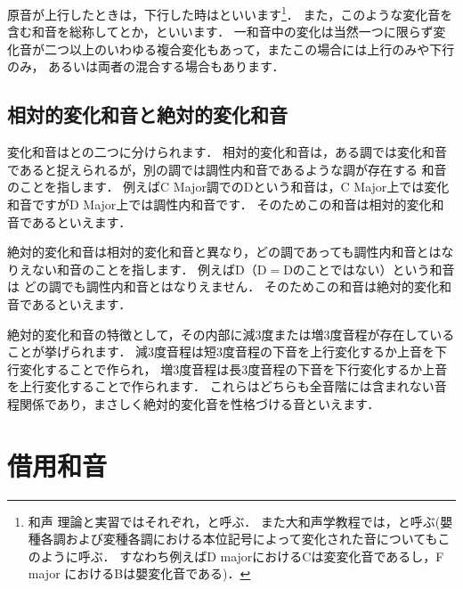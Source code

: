 \documentclass[dvipdfmx,uplatex,b5paper,openany,jbase=12Q,nomag*,textwidth-limit=44%
               ]{gachimuchi}[2020/05/05]
\begin{document}
原音が上行したときは，下行した時はといいます\footnote{%
和声 理論と実習ではそれぞれ，と呼ぶ．
また大和声学教程では，と呼ぶ(嬰種各調および変種各調における本位記号によって変化された音についてもこのように呼ぶ．
すなわち例えばD majorにおけるC\aNatural は変変化音であるし，F major におけるB\aNatural は嬰変化音である)．
}．
また，このような変化音を含む和音を総称してとか，といいます．
一和音中の変化は当然一つに限らず変化音が二つ以上のいわゆる複合変化もあって，またこの場合には上行のみや下行のみ，
あるいは両者の混合する場合もあります．

\subsection{相対的変化和音と絶対的変化和音}
変化和音はとの二つに分けられます．
相対的変化和音は，ある調では変化和音であると捉えられるが，別の調では調性内和音であるような調が存在する
和音のことを指します．
例えばC Major調でのDという和音は，C Major上では変化和音ですがD Major上では調性内和音です．
そのためこの和音は相対的変化和音であるといえます．

絶対的変化和音は相対的変化和音と異なり，どの調であっても調性内和音とはなりえない和音のことを指します．
例えばD（D\Min{}$=$D\Dimt のことではない）という和音は
どの調でも調性内和音とはなりえません．
そのためこの和音は絶対的変化和音であるといえます．
\begin{Music}[.6\linewidth]
  \nostartrule%
  \Startpiece
  \Notes%
  \zchordsl{\Gnii}%
  \en{}\changecontext%
  \Notes%
  \zchordsl{\Gni}%
  \en\setdoublebar{}\ignorenats\changecontext%
  \Notes%
  \en%
  \endpiece
\end{Music}

絶対的変化和音の特徴として，その内部に減3度または増3度音程が存在していることが挙げられます．
減3度音程は短3度音程の下音を上行変化するか上音を下行変化することで作られ，
増3度音程は長3度音程の下音を下行変化するか上音を上行変化することで作られます．
これらはどちらも全音階には含まれない音程関係であり，まさしく絶対的変化音を性格づける音といえます．


\section{借用和音}
\end{document}
